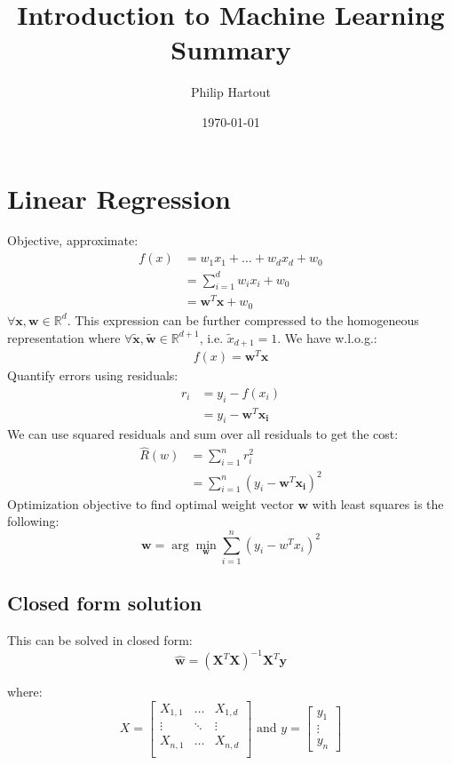 \documentclass[a4paper,10pt,twoside]{article}
\title{Introduction to Machine Learning \\ Summary}
\author{Philip Hartout}
\date{\today}
\begin{document}
\maketitle

\tableofcontents

\section{Linear Regression}
Objective, approximate:
\begin{align*}
    f(x) &= w_1x_1+\ldots+w_dx_d+w_0\\
        &= \sum_{i=1}^{d}w_ix_i+w_0\\
        &= \mathbf{w}^{T}\mathbf{x}+w_0
\end{align*}
$\forall \mathbf{x}, \mathbf{w}\in\mathbb{R}^{d}$. This expression can be further compressed to the homogeneous representation where $\forall \mathbf{\tilde{x}}, \mathbf{\tilde{w}}\in\mathbb{R}^{d+1}$, i.e. $\tilde{x}_{d+1}=1$. We have w.l.o.g.:
\begin{align*}
f(x) = \mathbf{w}^{T}\mathbf{x}
\end{align*}
Quantify errors using residuals:
\begin{align*}
    r_i &= y_i-f(x_i)\\
        &= y_i-\mathbf{w}^{T}\mathbf{x_i}
\end{align*}
We can use squared residuals and sum over all residuals to get the cost:
\begin{align}
    \label{objective_lse}
    \hat{R}(w) &= \sum_{i=1}^{n}r_i^2\\
               &= \sum_{i=1}^{n}(y_i-\mathbf{w}^{T}\mathbf{x_i})^2
\end{align}
Optimization objective to find optimal weight vector $\mathbf{w}$ with least squares is the following:
\begin{equation*}
    \mathbf{w} = \arg\min_{\mathbf{w}}\displaystyle\sum_{i=1}^{n}\left(y_i-w^{T}x_i\right)^2
\end{equation*}

\subsection{Closed form solution}
This can be solved in closed form:
\begin{equation*}
    \mathbf{\hat{w}} = (\mathbf{X}^{T}\mathbf{X})^{-1}\mathbf{X}^{T}\mathbf{y}
\end{equation*}

where:
\begin{equation*}
    X = 
    \begin{bmatrix}
        X_{1,1} & \ldots & X_{1,d}\\
        \vdots & \ddots & \vdots\\
        X_{n,1} & \ldots & X_{n,d}\\
    \end{bmatrix}        
    \text{ and }
    y = 
    \begin{bmatrix}
        y_{1} \\
        \vdots \\
        y_{n}
    \end{bmatrix}
\end{equation*}
\end{document}
